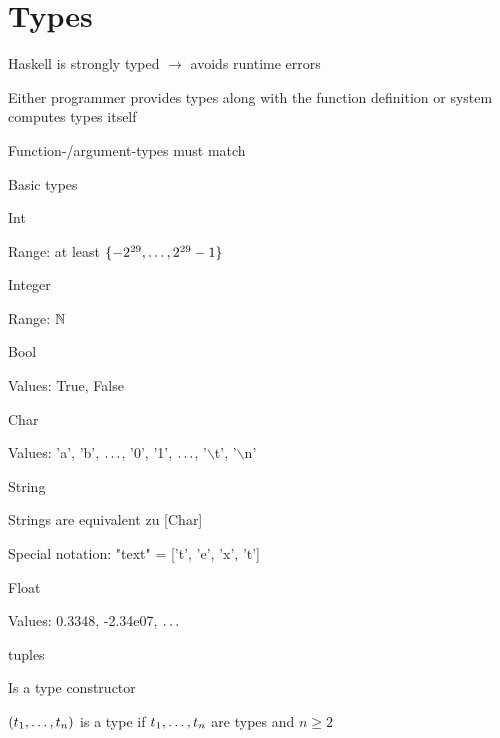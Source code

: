 \section{Types}
\enumstart
	\item Haskell is strongly typed $\rightarrow$ avoids runtime errors
	\item Either programmer provides types along with the function definition or system computes types itself
	\item Function-/argument-types must match
	\item Basic types
	\enumstart
		\item Int
		\enumstart
			\item Range: at least $\{-2^{29}, \mathellipsis, 2^{29}-1\}$
		\enumend
		\item Integer
		\enumstart
			\item Range: $\mathbb{N}$
		\enumend
		\item Bool
		\enumstart
			\item Values: True, False
		\enumend
		\item Char
		\enumstart
			\item Values: 'a', 'b', $\mathellipsis$, '0', '1', $\mathellipsis$, '$\backslash$t', '$\backslash$n'
		\enumend
		\item String
		\enumstart
			\item Strings are equivalent zu [Char]
			\item Special notation: "text" = ['t', 'e', 'x', 't']
		\enumend
		\item Float
		\enumstart
			\item Values: 0.3348, -2.34e07, $\mathellipsis$
		\enumend
		\item tuples
		\enumstart
			\item Is a type constructor
			\item $(t_1, \mathellipsis, t_n)$ is a type if $t_1, \mathellipsis, t_n$ are types and $n \ge 2$
		\enumend
	\enumend
\enumend
